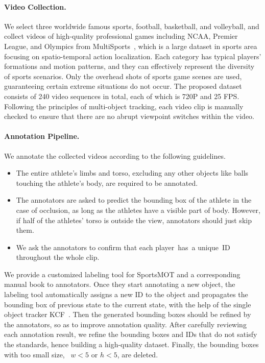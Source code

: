 \documentclass[10pt,twocolumn,letterpaper]{article}
\begin{document}
\paragraph{Video Collection.} 
We select three worldwide famous sports, football, basketball, and volleyball, and collect videos of high-quality professional games including NCAA, Premier League, and Olympics from MultiSports~\cite{multisports}, which is a large dataset in sports area focusing on spatio-temporal action localization. 
Each category has typical players' formations and motion patterns, and they can effectively represent the diversity of sports scenarios.
Only the overhead shots of sports game scenes are used, guaranteeing certain extreme situations do not occur.
The proposed dataset consists of 240 video sequences in total, each of which is 720P and 25 FPS.
Following the principles of multi-object tracking, each video clip is manually checked to ensure that there are no abrupt viewpoint switches within the video.

\vspace{-2mm}
\paragraph{Annotation Pipeline.}
We annotate the collected videos according to the following guidelines.
\vspace{-2mm}
\begin{itemize}
  \item The entire athlete's limbs and torso, excluding any other objects like balls touching the athlete's body, are required to be annotated.
  \vspace{-2mm}
  \item The annotators are asked to predict the bounding box of the athlete in the case of occlusion, as long as the athletes have a visible part of body. However, if half of the athletes' torso is outside the view, annotators should just skip them.
  \vspace{-2mm}
  \item We ask the annotators to confirm that each player has a unique ID throughout the whole clip.
\end{itemize}

We provide a customized labeling tool for SportsMOT and a corresponding manual book to annotators.
Once they start annotating a new object, the labeling tool automatically assigns a new ID to the object and propagates the bounding box of previous state to the current state, with the help of the single object tracker KCF~\cite{hannuna2019ds}.
Then the generated bounding boxes should be refined by the annotators, so as to improve annotation quality.
After carefully reviewing each annotation result, we refine the bounding boxes and IDs that do not satisfy the standards, hence building a high-quality dataset.
Finally, the bounding boxes with too small size, ~\ie $ w<5 $ or $ h < 5 $, are deleted.
\end{document}
